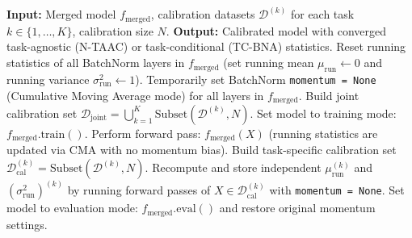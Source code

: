 \documentclass{article}
\theoremstyle{plain}
\theoremstyle{definition}
\theoremstyle{remark}
\begin{document}
\begin{algorithm}[tb]
\caption{Cumulative Moving Average (CMA) BatchNorm Calibration}
\label{alg:cma_bna}
\begin{algorithmic}[1]
\STATE \textbf{Input:} Merged model $f_{\text{merged}}$, calibration datasets $\mathcal{D}^{(k)}$ for each task $k \in \{1, \dots, K\}$, calibration size $N$.
\STATE \textbf{Output:} Calibrated model with converged task-agnostic (N-TAAC) or task-conditional (TC-BNA) statistics.
\STATE Reset running statistics of all BatchNorm layers in $f_{\text{merged}}$ (set running mean $\mu_{\text{run}} \leftarrow 0$ and running variance $\sigma_{\text{run}}^2 \leftarrow 1$).
\STATE Temporarily set BatchNorm \texttt{momentum = None} (Cumulative Moving Average mode) for all layers in $f_{\text{merged}}$.
    \STATE Build joint calibration set $\mathcal{D}_{\text{joint}} = \bigcup_{k=1}^K \text{Subset}(\mathcal{D}^{(k)}, N)$.
    \STATE Set model to training mode: $f_{\text{merged}}.\text{train}()$.
        \STATE Perform forward pass: $f_{\text{merged}}(X)$ (running statistics are updated via CMA with no momentum bias).
    \ENDFOR
{}
        \STATE Build task-specific calibration set $\mathcal{D}_{\text{cal}}^{(k)} = \text{Subset}(\mathcal{D}^{(k)}, N)$.
        \STATE Recompute and store independent $\mu_{\text{run}}^{(k)}$ and $(\sigma_{\text{run}}^2)^{(k)}$ by running forward passes of $X \in \mathcal{D}_{\text{cal}}^{(k)}$ with \texttt{momentum = None}.
    \ENDFOR
\ENDIF
\STATE Set model to evaluation mode: $f_{\text{merged}}.\text{eval}()$ and restore original momentum settings.
\end{algorithmic}
\end{algorithm}
\end{document}
